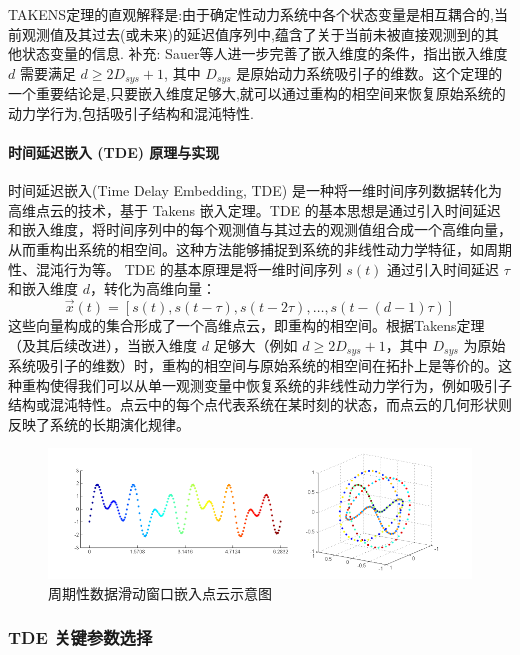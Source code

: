 TAKENS定理的直观解释是:由于确定性动力系统中各个状态变量是相互耦合的,当前观测值及其过去(或未来)的延迟值序列中,蕴含了关于当前未被直接观测到的其他状态变量的信息.
补充: Sauer等人进一步完善了嵌入维度的条件，指出嵌入维度 $d$ 需要满足 $d \geq 2D_{sys}+1$, 其中 $D_{sys}$ 是原始动力系统吸引子的维数。这个定理的一个重要结论是,只要嵌入维度足够大,就可以通过重构的相空间来恢复原始系统的动力学行为,包括吸引子结构和混沌特性.

\paragraph{时间延迟嵌入 (TDE) 原理与实现} %
时间延迟嵌入(Time Delay Embedding, TDE) 是一种将一维时间序列数据转化为高维点云的技术，基于 Takens 嵌入定理。TDE 的基本思想是通过引入时间延迟和嵌入维度，将时间序列中的每个观测值与其过去的观测值组合成一个高维向量，从而重构出系统的相空间。这种方法能够捕捉到系统的非线性动力学特征，如周期性、混沌行为等。
TDE 的基本原理是将一维时间序列 \( s(t) \) 通过引入时间延迟 \( \tau \) 和嵌入维度 \( d \)，转化为高维向量：
\begin{equation}
    \vec{x}(t) = \left[ s(t), s(t - \tau), s(t - 2\tau), \dots, s(t - (d - 1)\tau) \right]
\end{equation}
这些向量构成的集合形成了一个高维点云，即重构的相空间。根据Takens定理（及其后续改进），当嵌入维度 $d$ 足够大（例如 $d \geq 2D_{sys} + 1$，其中 $D_{sys}$ 为原始系统吸引子的维数）时，重构的相空间与原始系统的相空间在拓扑上是等价的。这种重构使得我们可以从单一观测变量中恢复系统的非线性动力学行为，例如吸引子结构或混沌特性。点云中的每个点代表系统在某时刻的状态，而点云的几何形状则反映了系统的长期演化规律。
\begin{figure}[thbp!]
    \centering
    \includegraphics[width=1.0\textwidth]{figure/滑动窗口嵌入示意图、.png}
    \caption{周期性数据滑动窗口嵌入点云示意图}
    \label{fig:tde_example}
\end{figure}

\subsubsection{TDE 关键参数选择}
